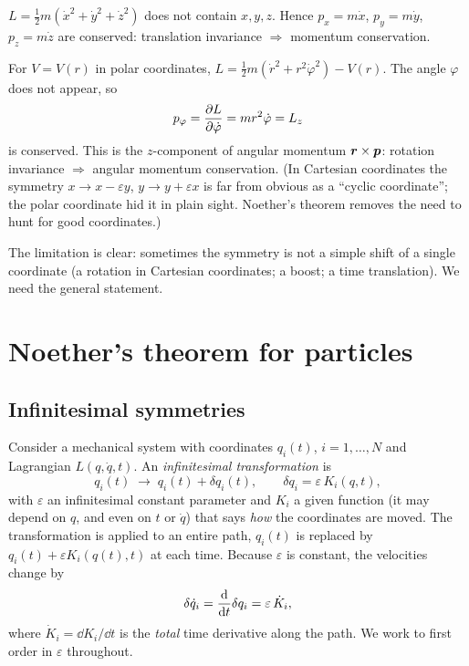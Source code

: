 \documentclass[11pt]{article}
\newcommand{\eps}{\varepsilon}
\begin{document}
\begin{example}
$L=\tfrac12 m(\dot x^2+\dot y^2+\dot z^2)$ does not contain $x,y,z$. Hence $p_x=m\dot x$, $p_y=m\dot y$, $p_z=m\dot z$ are conserved: translation invariance $\Rightarrow$ momentum conservation.
\end{example}

\begin{example}
For $V=V(r)$ in polar coordinates, $L=\tfrac12 m(\dot r^2+r^2\dot\varphi^2)-V(r)$. The angle $\varphi$ does not appear, so
\begin{equation}
  p_\varphi=\frac{\partial L}{\partial \dot\varphi}=mr^2\dot\varphi=L_z
\end{equation}
is conserved. This is the $z$-component of angular momentum $\bm{r}\times\bm{p}$: rotation invariance $\Rightarrow$ angular momentum conservation. (In Cartesian coordinates the symmetry $x\to x-\eps y$, $y\to y+\eps x$ is far from obvious as a ``cyclic coordinate''; the polar coordinate hid it in plain sight. Noether's theorem removes the need to hunt for good coordinates.)
\end{example}

The limitation is clear: sometimes the symmetry is not a simple shift of a single coordinate (a rotation in Cartesian coordinates; a boost; a time translation). We need the general statement.

\section{Noether's theorem for particles}

\subsection{Infinitesimal symmetries}

Consider a mechanical system with coordinates $q_i(t)$, $i=1,\dots,N$ and Lagrangian $L(q,\dot q,t)$. An \emph{infinitesimal transformation} is
\begin{equation}
  q_i(t)\;\longrightarrow\; q_i(t)+\delta q_i(t),\qquad \delta q_i=\eps\,K_i(q,t),
  \label{eq:dq}
\end{equation}
with $\eps$ an infinitesimal constant parameter and $K_i$ a given function (it may depend on $q$, and even on $t$ or $\dot q$) that says \emph{how} the coordinates are moved. The transformation is applied to an entire path, $q_i(t)$ is replaced by $q_i(t)+\eps K_i(q(t),t)$ at each time. Because $\eps$ is constant, the velocities change by
\begin{equation}
  \delta\dot q_i=\diff{}{t}\delta q_i=\eps\,\dot K_i,
  \label{eq:dqdot}
\end{equation}
where $\dot K_i=\dd K_i/\dd t$ is the \emph{total} time derivative along the path. We work to first order in $\eps$ throughout.
\end{document}
